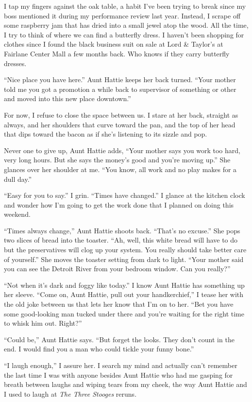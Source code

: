 \documentclass[twoside,10pt]{book}
\begin{document}
I tap my fingers against the oak table, a habit I've been trying to
break since my boss men­tioned it during my performance review last
year. Instead, I scrape off some raspberry jam that has dried into a
small jewel atop the wood. All the time, I try to think of where we can
find a butterfly dress. I haven't been shopping for clothes since I
found the black business suit on sale at Lord \& Taylor's at Fairlane
Center Mall a few months back. Who knows if they carry butterfly
dresses.

``Nice place you have here.'' Aunt Hattie keeps her back turned. ``Your
mother told me you got a promotion a while back to supervisor of
something or other and moved into this new place downtown.''

For now, I refuse to close the space between us. I stare at her back,
straight as always, and her shoulders that curve toward the pan, and the
top of her head that dips toward the bacon as if she's listening to its
sizzle and pop.

Never one to give up, Aunt Hattie adds, ``Your mother says you work too
hard, very long hours. But she says the money's good and you're moving
up.'' She glances over her shoulder at me. ``You know, all work and no
play makes for a dull day.''

``Easy for you to say.'' I grin. ``Times have changed.'' I glance at the
kitchen clock and wonder how I'm going to get the work done that I
planned on doing this weekend.

``Times always change,'' Aunt Hattie shoots back. ``That's no excuse.''
She pops two slices of bread into the toaster. ``Ah, well, this white
bread will have to do but the preservatives will clog up your system.
You really should take better care of yourself.'' She moves the toaster
setting from dark to light. ``Your mother said you can see the Detroit
River from your bedroom window. Can you really?''

``Not when it's dark and foggy like today.'' I know Aunt Hattie has
something up her sleeve. ``Come on, Aunt Hattie, pull out your
handkerchief,'' I tease her with the old joke between us that lets her
know that I'm on to her. ``Bet you have some good-looking man tucked
under there and you're waiting for the right time to whisk him out.
Right?''

``Could be,'' Aunt Hattie says. ``But forget the looks. They don't count
in the end. I would find you a man who could tickle your funny bone.''

``I laugh enough,'' I assure her. I search my mind and actually can't
remember the last time I was with anyone besides Aunt Hattie who had me
gasping for breath between laughs and wiping tears from my cheek, the
way Aunt Hattie and I used to laugh at \emph{The Three Stooges} reruns.
\end{document}
